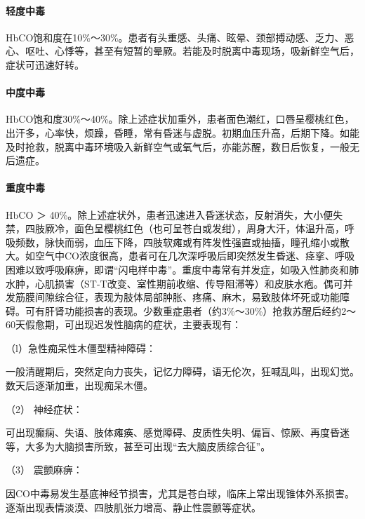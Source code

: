 \paragraph{轻度中毒}

HbCO饱和度在10\%～30\%。患者有头重感、头痛、眩晕、颈部搏动感、乏力、恶心、呕吐、心悸等，甚至有短暂的晕厥。若能及时脱离中毒现场，吸新鲜空气后，症状可迅速好转。

\paragraph{中度中毒}

HbCO饱和度30\%～40\%。除上述症状加重外，患者面色潮红，口唇呈樱桃红色，出汗多，心率快，烦躁，昏睡，常有昏迷与虚脱。初期血压升高，后期下降。如能及时抢救，脱离中毒环境吸入新鲜空气或氧气后，亦能苏醒，数日后恢复，一般无后遗症。

\paragraph{重度中毒}

HbCO ＞
40\%。除上述症状外，患者迅速进入昏迷状态，反射消失，大小便失禁，四肢厥冷，面色呈樱桃红色（也可呈苍白或发绀），周身大汗，体温升高，呼吸频数，脉快而弱，血压下降，四肢软瘫或有阵发性强直或抽搐，瞳孔缩小或散大。如空气中CO浓度很高，患者可在几次深呼吸后即突然发生昏迷、痉挛、呼吸困难以致呼吸麻痹，即谓“闪电样中毒”。重度中毒常有并发症，如吸入性肺炎和肺水肿，心肌损害（ST-T改变、室性期前收缩、传导阻滞等）和皮肤水疱。偶可并发筋膜间隙综合征，表现为肢体局部肿胀、疼痛、麻木，易致肢体坏死或功能障碍。可有肝肾功能损害的表现。少数重症患者（约3\%～30\%）抢救苏醒后经约2～60天假愈期，可出现迟发性脑病的症状，主要表现有：

\hypertarget{text00147.htmlux5cux23CHP5-4-1-2-2-3-1}{}
（l）急性痴呆性木僵型精神障碍：

一般清醒期后，突然定向力丧失，记忆力障碍，语无伦次，狂喊乱叫，出现幻觉。数天后逐渐加重，出现痴呆木僵。

\hypertarget{text00147.htmlux5cux23CHP5-4-1-2-2-3-2}{}
（2） 神经症状：

可出现癫痫、失语、肢体瘫痪、感觉障碍、皮质性失明、偏盲、惊厥、再度昏迷等，大多为大脑损害所致，甚至可出现“去大脑皮质综合征”。

\hypertarget{text00147.htmlux5cux23CHP5-4-1-2-2-3-3}{}
（3） 震颤麻痹：

因CO中毒易发生基底神经节损害，尤其是苍白球，临床上常出现锥体外系损害。逐渐出现表情淡漠、四肢肌张力增高、静止性震颤等症状。

